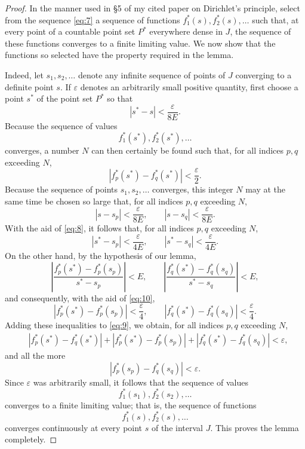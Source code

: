 \documentclass[b5paper,twoside]{article}
\newcommand{\originalpage}[1]{\phantomsection\label{origpage:#1}}
\begin{document}
\begin{proof}
In the manner used in \S5 of my cited paper on Dirichlet's principle, select
from the sequence \eqref{eq:7} a sequence of functions
$f_1^*(s),f_2^*(s),\ldots$ such that, at every point of a countable point set
$P^*$ everywhere dense in $J$, the sequence of these functions converges to a
finite limiting value.  We now show that the functions so selected have the
property required in the lemma.

Indeed, let $s_1,s_2,\ldots$ denote any infinite sequence of points of $J$
converging to a definite point $s$.  If $\varepsilon$ denotes an arbitrarily
small positive quantity, first choose a point $s^*$ of the point set
\originalpage{163}$P^*$ so that
\begin{equation}
\tag{8}\label{eq:8}
  |s^*-s|<\frac{\varepsilon}{8E}.
\end{equation}
Because the sequence of values
\[
  f_1^*(s^*),f_2^*(s^*),\ldots
\]
converges, a number $N$ can then certainly be found such that, for all
indices $p,q$ exceeding $N$,
\begin{equation}
\tag{9}\label{eq:9}
  |f_p^*(s^*)-f_q^*(s^*)|<\frac{\varepsilon}{2}.
\end{equation}
Because the sequence of points $s_1,s_2,\ldots$ converges, this integer $N$
may at the same time be chosen so large that, for all indices $p,q$ exceeding
$N$,
\[
  |s-s_p|<\frac{\varepsilon}{8E},
  \qquad
  |s-s_q|<\frac{\varepsilon}{8E}.
\]
With the aid of \eqref{eq:8}, it follows that, for all indices $p,q$
exceeding $N$,
\begin{equation}
\tag{10}\label{eq:10}
  |s^*-s_p|<\frac{\varepsilon}{4E},
  \qquad
  |s^*-s_q|<\frac{\varepsilon}{4E}.
\end{equation}
On the other hand, by the hypothesis of our lemma,
\[
  \left|\frac{f_p^*(s^*)-f_p^*(s_p)}{s^*-s_p}\right|<E,
  \qquad
  \left|\frac{f_q^*(s^*)-f_q^*(s_q)}{s^*-s_q}\right|<E,
\]
and consequently, with the aid of \eqref{eq:10},
\[
  |f_p^*(s^*)-f_p^*(s_p)|<\frac{\varepsilon}{4},
  \qquad
  |f_q^*(s^*)-f_q^*(s_q)|<\frac{\varepsilon}{4}.
\]
Adding these inequalities to \eqref{eq:9}, we obtain, for all indices $p,q$
exceeding $N$,
\[
\begin{aligned}
  &|f_p^*(s^*)-f_q^*(s^*)|
   +|f_p^*(s^*)-f_p^*(s_p)|
   +|f_q^*(s^*)-f_q^*(s_q)|<\varepsilon,
\end{aligned}
\]
and all the more
\[
  |f_p^*(s_p)-f_q^*(s_q)|<\varepsilon.
\]
Since $\varepsilon$ was arbitrarily small, it follows that the sequence of
values
\[
  f_1^*(s_1),f_2^*(s_2),\ldots
\]
converges to a finite limiting value; that is, the sequence of functions
\[
  f_1^*(s),f_2^*(s),\ldots
\]
\originalpage{164}converges continuously at every point $s$ of the interval $J$.  This proves
the lemma completely.
\end{proof}
\end{document}
